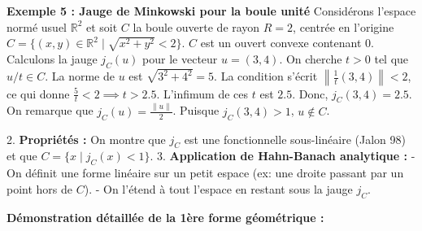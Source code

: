 \documentclass[11pt,a4paper]{article}
\begin{document}
\textbf{Exemple 5 : Jauge de Minkowski pour la boule unité}
Considérons l'espace normé usuel $\mathbb{R}^2$ et soit $C$ la boule ouverte de rayon $R=2$, centrée en l'origine $C = \{ (x,y) \in \mathbb{R}^2 \mid \sqrt{x^2+y^2} < 2 \}$. $C$ est un ouvert convexe contenant $0$.
Calculons la jauge $j_C(u)$ pour le vecteur $u=(3,4)$.
On cherche $t > 0$ tel que $u/t \in C$.
La norme de $u$ est $\sqrt{3^2+4^2} = 5$.
La condition s'écrit $\left\| \frac{1}{t}(3,4) \right\| < 2$, ce qui donne $\frac{5}{t} < 2 \implies t > 2.5$.
L'infimum de ces $t$ est $2.5$. Donc, $j_C(3,4) = 2.5$.
On remarque que $j_C(u) = \frac{\|u\|}{2}$. Puisque $j_C(3,4) > 1$, $u \notin C$.

2. \textbf{Propriétés :} On montre que $j_C$ est une fonctionnelle sous-linéaire (Jalon 98) et que $C = \{ x \mid j_C(x) < 1 \}$.
3. \textbf{Application de Hahn-Banach analytique :}
   - On définit une forme linéaire sur un petit espace (ex: une droite passant par un point hors de $C$).
   - On l'étend à tout l'espace en restant sous la jauge $j_C$.

\textbf{Démonstration détaillée de la 1ère forme géométrique :}
\end{document}
